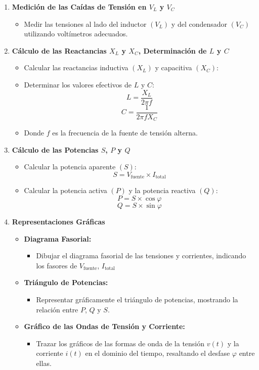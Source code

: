 \documentclass{article}
\begin{document}
\begin{enumerate}
    \item \textbf{Medición de las Caídas de Tensión en $V_L$ y $V_C$}
    \begin{itemize}
        \item Medir las tensiones al lado del inductor $(V_L)$ y del condensador $(V_C)$ utilizando voltímetros adecuados.
    \end{itemize}

    \item \textbf{Cálculo de las Reactancias $X_L$ y $X_C$, Determinación de $L$ y $C$}
    \begin{itemize}
        \item Calcular las reactancias inductiva $(X_L)$ y capacitiva $(X_C)$:

        \item Determinar los valores efectivos de $L$ y $C$:
        \[
        L = \frac{X_L}{2\pi f}
        \]
        \[
        C = \frac{1}{2\pi f X_C}
        \]
        \item Donde $f$ es la frecuencia de la fuente de tensión alterna.
    \end{itemize}

    \item \textbf{Cálculo de las Potencias $S$, $P$ y $Q$}
    \begin{itemize}
        \item Calcular la potencia aparente $(S)$:
        \[
        S = V_{\text{fuente}} \times I_{\text{total}}
        \]
        \item Calcular la potencia activa $(P)$ y la potencia reactiva $(Q)$:
        \[
        P = S \times \cos \varphi
        \]
        \[
        Q = S \times \sin \varphi
        \]
    \end{itemize}

    \item \textbf{Representaciones Gráficas}
    \begin{itemize}
        \item \textbf{Diagrama Fasorial:}
        \begin{itemize}
            \item Dibujar el diagrama fasorial de las tensiones y corrientes, indicando los fasores de $V_{\text{fuente}}$, $I_{\text{total}}$
        \end{itemize}
        \item \textbf{Triángulo de Potencias:}
        \begin{itemize}
            \item Representar gráficamente el triángulo de potencias, mostrando la relación entre $P$, $Q$ y $S$.
        \end{itemize}
        \item \textbf{Gráfico de las Ondas de Tensión y Corriente:}
        \begin{itemize}
            \item Trazar los gráficos de las formas de onda de la tensión $v(t)$ y la corriente $i(t)$ en el dominio del tiempo, resaltando el desfase $\varphi$ entre ellas.
        \end{itemize}
    \end{itemize}

\end{enumerate}
\end{document}

